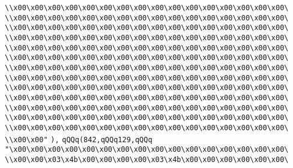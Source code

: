 \verb|\\x00\x00\x00\x00\x00\x00\x00\x00\x00\x00\x00\x00\x00\x00\x00\x00\|\newline
\verb|\\x00\x00\x00\x00\x00\x00\x00\x00\x00\x00\x00\x00\x00\x00\x00\x00\|\newline
\verb|\\x00\x00\x00\x00\x00\x00\x00\x00\x00\x00\x00\x00\x00\x00\x00\x00\|\newline
\verb|\\x00\x00\x00\x00\x00\x00\x00\x00\x00\x00\x00\x00\x00\x00\x00\x00\|\newline
\verb|\\x00\x00\x00\x00\x00\x00\x00\x00\x00\x00\x00\x00\x00\x00\x00\x00\|\newline
\verb|\\x00\x00\x00\x00\x00\x00\x00\x00\x00\x00\x00\x00\x00\x00\x00\x00\|\newline
\verb|\\x00\x00\x00\x00\x00\x00\x00\x00\x00\x00\x00\x00\x00\x00\x00\x00\|\newline
\verb|\\x00\x00\x00\x00\x00\x00\x00\x00\x00\x00\x00\x00\x00\x00\x00\x00\|\newline
\verb|\\x00\x00\x00\x00\x00\x00\x00\x00\x00\x00\x00\x00\x00\x00\x00\x00\|\newline
\verb|\\x00\x00\x00\x00\x00\x00\x00\x00\x00\x00\x00\x00\x00\x00\x00\x00\|\newline
\verb|\\x00\x00\x00\x00\x00\x00\x00\x00\x00\x00\x00\x00\x00\x00\x00\x00\|\newline
\verb|\\x00\x00\x00\x00\x00\x00\x00\x00\x00\x00\x00\x00\x00\x00\x00\x00\|\newline
\verb|\\x00\x00\x00\x00\x00\x00\x00\x00\x00\x00\x00\x00\x00\x00\x00\x00\|\newline
\verb|\\x00\x00"|\newline
\verb|),|\newline
\verb|qQQq(842,qQQq129,qQQq|\newline
\verb|"\x00\x00\x00\x00\x00\x00\x00\x00\x00\x00\x00\x00\x00\x00\x00\x00\|\newline
\verb|\\x00\x00\x03\x4b\x00\x00\x00\x00\x03\x4b\x00\x00\x00\x00\x00\x00\|\newline
